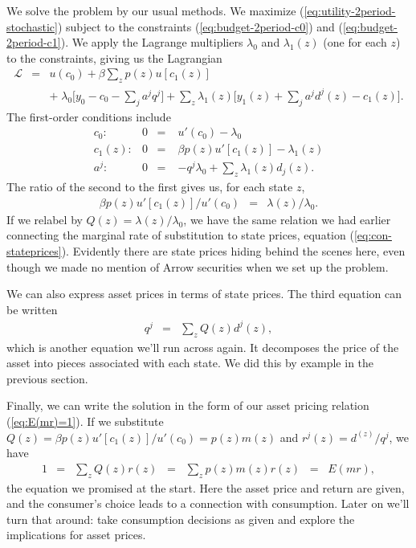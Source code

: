 \documentclass[11pt]{article}
\begin{document}
We solve the problem by our usual methods.
We maximize (\ref{eq:utility-2period-stochastic})
subject to the constraints (\ref{eq:budget-2period-c0}) and (\ref{eq:budget-2period-c1}).
We apply the Lagrange multipliers $\lambda_0$ and $\lambda_1(z)$ (one for each $z$) to the constraints,
giving us the Lagrangian
\begin{eqnarray*}
    \mathcal{L} &=& u(c_0) + \beta \sum_z p(z) u[c_1(z)] \\
        &&   + \; \lambda_0 \Big[ y_0 - c_0 - \sum_j a^j q^j \Big]
        + \sum_z \lambda_1(z) \Big[ y_1(z) + \sum_j a^j d^j(z) - c_1(z) \Big] .
\end{eqnarray*}
The first-order conditions include
\begin{eqnarray*}
  c_0: &        0 \;\;=& u'(c_0) - \lambda_0 \\
  c_1(z): &     0 \;\;=& \beta p(z) u'[c_1(z)] - \lambda_1(z) \\
  a^j: &        0 \;\;=& - q^j \lambda_0 + \sum_z \lambda_1(z) d_j(z) .
\end{eqnarray*}
The ratio of the second to the first gives us, for each state $z$,
\begin{eqnarray*}
    \beta p(z) u'[c_1(z)] / u'(c_0) &=& \lambda(z)/\lambda_0 .
\end{eqnarray*}
If we relabel by $Q(z) = \lambda(z)/\lambda_0$, we have the same relation
we had earlier connecting  the marginal rate of substitution to state prices,
equation (\ref{eq:con-stateprices}).
Evidently there are state prices hiding behind the scenes here,
even though we made no mention of Arrow securities when we set up the problem.

We can also express asset prices in terms of state prices.
The third equation can be written
\begin{eqnarray*}
    q^j &=& \sum_z Q(z) d^j(z) ,
\end{eqnarray*}
which is another equation we'll run across again.
It decomposes the price of the asset into pieces associated with each state.
We did this by example in the previous section.

Finally, we can write the solution in the form of
our asset pricing relation (\ref{eq:E(mr)=1}).
If we substitute
$ Q(z) = \beta p(z) u'[c_1(z)] / u'(c_0) = p(z) m(z)$
and $r^j(z) = d^(z)/q^j $,
we have
\begin{eqnarray*}
    1 &=& \sum_z Q(z) r(z) \;\;=\;\; \sum_z p(z) m(z) r(z) \;\;=\;\; E (mr) ,
\end{eqnarray*}
the equation we promised at the start.
Here the asset price and return are given,
and the consumer's choice leads to a connection with consumption.
Later on we'll turn that around:
take consumption decisions as given and explore
the implications for asset prices.
\end{document}
